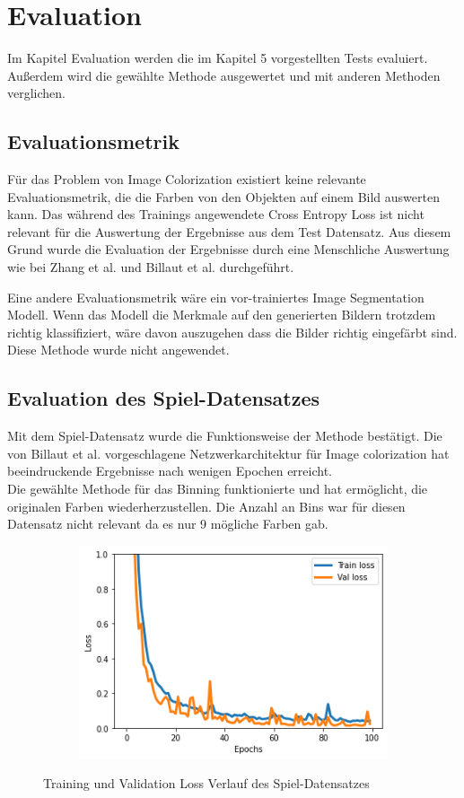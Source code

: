 \chapter{Evaluation}
\label{sec:evaluation}
Im Kapitel Evaluation werden die im Kapitel 5 vorgestellten Tests evaluiert. Außerdem wird die gewählte Methode ausgewertet und
mit anderen Methoden verglichen.

\section{Evaluationsmetrik}
Für das Problem von Image Colorization existiert keine relevante Evaluationsmetrik, die die Farben von den Objekten auf einem Bild auswerten kann.
Das während des Trainings angewendete Cross Entropy Loss ist nicht relevant für die Auswertung der Ergebnisse aus dem Test Datensatz. Aus diesem
Grund wurde die Evaluation der Ergebnisse durch eine Menschliche Auswertung wie bei Zhang et al. und Billaut et al.
durchgeführt.

Eine andere Evaluationsmetrik wäre ein vor-trainiertes Image Segmentation Modell. Wenn das Modell die Merkmale auf den generierten Bildern
trotzdem richtig klassifiziert, wäre davon auszugehen dass die Bilder richtig eingefärbt sind. Diese Methode wurde nicht angewendet.

\section{Evaluation des Spiel-Datensatzes}
Mit dem Spiel-Datensatz wurde die Funktionsweise der Methode bestätigt. Die von Billaut et al. vorgeschlagene Netzwerkarchitektur für Image
colorization hat beeindruckende Ergebnisse nach wenigen Epochen erreicht.
\\
Die gewählte Methode für das Binning funktionierte und hat ermöglicht, die originalen Farben wiederherzustellen. Die Anzahl an
Bins war für diesen Datensatz nicht relevant da es nur 9 mögliche Farben gab.

\begin{figure}[H]
  \vspace{1cm}
  \centering
  \begin{subfigure}
    \centering
    \includegraphics[width=.5\textwidth]{resources/experiments/toy_100_324_0001.png}
  \end{subfigure}
  \caption{Training und Validation Loss Verlauf des Spiel-Datensatzes}
  \label{image:toy-dataset-loss}
\end{figure}

